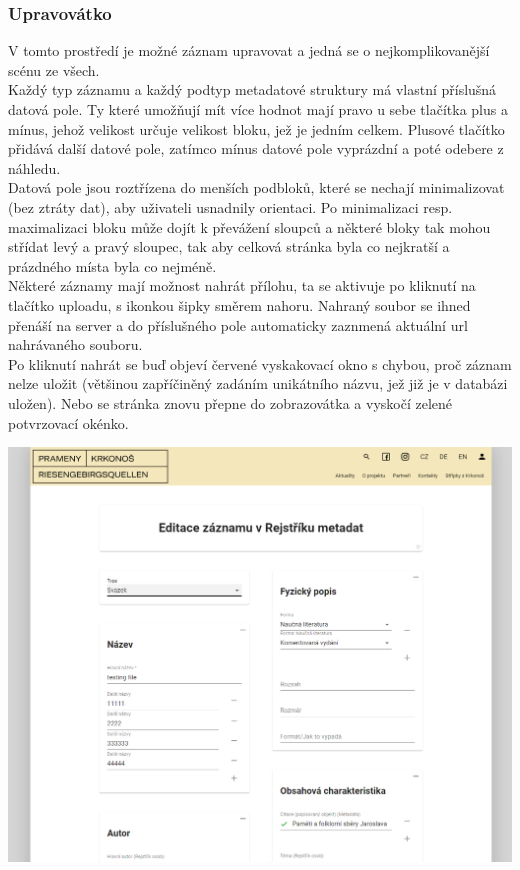 \subsubsection{Upravovátko}
V tomto prostředí je možné záznam upravovat a jedná se o nejkomplikovanější scénu ze všech.\\
Každý typ záznamu a každý podtyp metadatové struktury má vlastní příslušná datová pole.
Ty které umožňují mít více hodnot mají pravo u sebe tlačítka plus a mínus,
jehož velikost určuje velikost bloku, jež je jedním celkem. Plusové tlačítko přidává
další datové pole, zatímco mínus datové pole vyprázdní a poté odebere z náhledu.\\
Datová pole jsou roztřízena do menších podbloků, které se nechají minimalizovat (bez ztráty dat),
aby uživateli usnadnily orientaci. Po minimalizaci resp. maximalizaci bloku může dojít k převážení
sloupců a některé bloky tak mohou střídat levý a pravý sloupec, tak aby celková stránka byla co nejkratší
a prázdného místa byla co nejméně.\\
Některé záznamy mají možnost nahrát přílohu, ta se aktivuje po kliknutí na tlačítko uploadu, s ikonkou šipky
směrem nahoru. Nahraný soubor se ihned přenáší na server a do příslušného pole automaticky 
zaznmená aktuální url nahrávaného souboru.\\
Po kliknutí nahrát se buď objeví červené vyskakovací okno s chybou, proč záznam nelze uložit
(většinou zapříčiněný zadáním unikátního názvu, jež již je v databázi uložen).
Nebo se stránka znovu přepne do zobrazovátka a vyskočí zelené potvrzovací okénko.
\begin{center}
	\includegraphics[width=.8\textwidth]{img/editScene.png}
\end{center}


